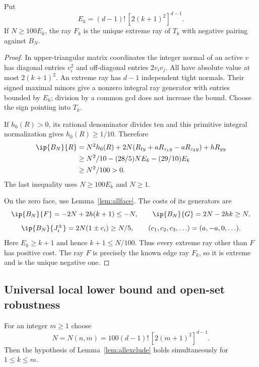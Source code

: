 \begin{lemma}\label{lem:allexclude}
Put
\begin{equation}\label{eq:allEk}
 E_k=(d-1)!\,[2(k+1)^2]^{d-1}.
\end{equation}
If $N\ge100E_k$, the ray $F_k$ is the unique extreme ray of $T_k$ with negative pairing against $B_N$.
\end{lemma}
\begin{proof}
In upper-triangular matrix coordinates the integer normal of an active $v$ has diagonal entries $v_i^2$ and off-diagonal entries $2v_iv_j$. All have absolute value at most $2(k+1)^2$. An extreme ray has $d-1$ independent tight normals. Their signed maximal minors give a nonzero integral ray generator with entries bounded by $E_k$; division by a common gcd does not increase the bound. Choose the sign pointing into $T_k$.

If $h_0(R)>0$, its rational denominator divides ten and this primitive integral normalization gives $h_0(R)\ge1/10$. Therefore
\begin{align*}
 \ip{B_N}{R}
 &=N^2h_0(R)+2N(R_{ty}+aR_{z_1y}-aR_{z_2y})+hR_{yy}\\
 &\ge N^2/10-(28/5)NE_k-(29/10)E_k\\
 &\ge N^2/100>0.
\end{align*}
The last inequality uses $N\ge100E_k$ and $N\ge1$.

On the zero face, use Lemma~\ref{lem:allface}. The costs of its generators are
\[
 \ip{B_N}{F}=-2N+2h(k+1)\le-N,
 \qquad \ip{B_N}{G}=2N-2hk\ge N,
\]
\[
 \ip{B_N}{J_i^\pm}=2N(1\pm c_i)\ge N/5,
 \qquad(c_1,c_2,c_3,\ldots)=(a,-a,0,\ldots).
\]
Here $E_k\ge k+1$ and hence $k+1\le N/100$. Thus every extreme ray other than $F$ has positive cost. The ray $F$ is precisely the known edge ray $F_k$, so it is extreme and is the unique negative one.
\end{proof}

\subsection{Universal local lower bound and open-set robustness}
For an integer $m\ge1$ choose
\begin{equation}\label{eq:allN}
 N=N(n,m)=100(d-1)!\,[2(m+1)^2]^{d-1}.
\end{equation}
Then the hypothesis of Lemma~\ref{lem:allexclude} holds simultaneously for $1\le k\le m$.

